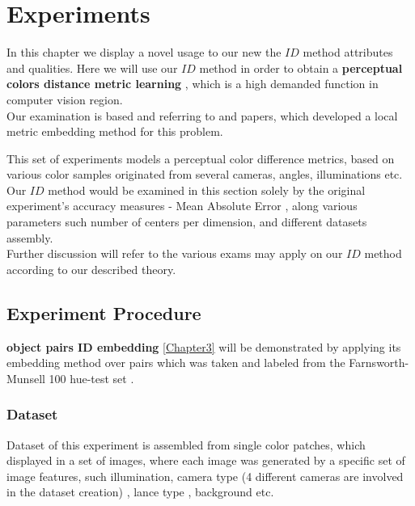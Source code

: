 
\chapter{Experiments} %

\label{Chapter8}

In this chapter we display a novel usage to our new the $ID$ method attributes and qualities. Here we will use our $ID$ method in order to obtain a \textbf{perceptual colors distance metric learning} \cite{perp_color}, which is a high demanded function in computer vision region.\\ 
Our examination is based and referring to \cite{perp_color} and \cite{c2lm} papers, which developed a local metric embedding method for this problem. 

This set of experiments models a perceptual color difference metrics, based on various color samples originated from several cameras, angles, illuminations etc.
\\

Our $ID$ method would be examined in this section solely by the original experiment's accuracy measures - Mean Absolute Error \cite{MAE}, along various parameters such number of centers per dimension, and different datasets assembly.
\\
Further discussion will refer to the various exams may apply on our $ID$ method according to our described theory.

\section{Experiment Procedure}

\textbf{object pairs ID embedding} \ref{Chapter3} will be demonstrated by applying its embedding method over pairs which was taken and labeled from the Farnsworth-Munsell 100 hue-test set \cite{farnsworth}.
\subsection{Dataset}

Dataset of this experiment is assembled from single color patches, which displayed in a set of images, where each image was generated by a specific set of image features, such illumination, camera type (4 different cameras are involved in the dataset creation) , lance type , background etc.


